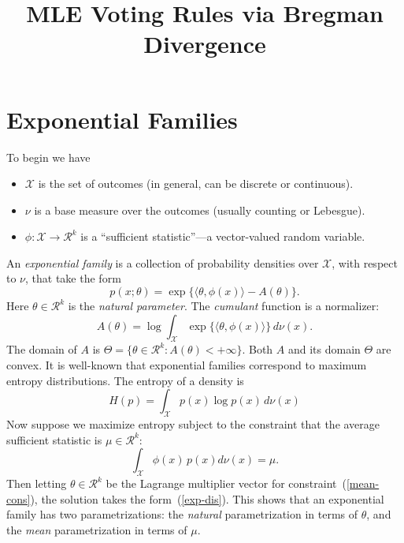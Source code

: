\documentclass[10pt,letterpaper]{article}
\title{MLE Voting Rules via Bregman Divergence}
\newcommand{\X}{\ensuremath{\mathcal{X}}}
\newcommand{\R}{\ensuremath{\mathcal{R}}}
\newcommand{\ip}[2]{\ensuremath{\langle #1, #2 \rangle}}
\begin{document}
\maketitle


\section{Exponential Families}

To begin we have
%
\begin{itemize}
\item $\X$ is the set of outcomes (in general, can be discrete or continuous).
\item $\nu$ is a base measure over the outcomes (usually counting or Lebesgue).
\item $\phi : \X \rightarrow \R^k$ is a ``sufficient statistic''---a vector-valued random variable.
\end{itemize}
%
An \emph{exponential family} is a collection of probability densities over $\X$, with respect to $\nu$, that take the form
%
\begin{equation} \label{exp-dis}
 p(x ; \theta) = \exp \{ \ip{\theta}{\phi(x)} - A(\theta) \}.
\end{equation}
%
Here $\theta \in \R^k$ is the \emph{natural parameter}. The \emph{cumulant} function is a normalizer:
%
\begin{equation} \label{log-partition}
A(\theta) = \log \int_{\X} \exp\{ \ip{\theta}{\phi(x)} \} \, d\nu(x).
\end{equation}
%
The domain of $A$ is $\Theta = \{\theta \in \R^k : A(\theta) < +\infty\}$. Both $A$ and its domain $\Theta$ are convex. It is well-known that exponential families correspond to maximum entropy distributions. The entropy of a density is
%
\begin{equation} \label{entropy}
H(p) = \int_{\X} p(x) \log p(x) \, d\nu(x)
\end{equation}
%
Now suppose we maximize entropy subject to the constraint that the average sufficient statistic is $\mu \in \R^k$:
%
\begin{equation} \label{mean-cons}
\int_{\X} \phi(x) \, p(x) d\nu(x) = \mu.
\end{equation}
%
Then letting $\theta \in \R^k$ be the Lagrange multiplier vector for constraint~(\ref{mean-cons}), the solution takes the form~(\ref{exp-dis}). This shows that an exponential family has two parametrizations: the \emph{natural} parametrization in terms of $\theta$, and the \emph{mean} parametrization in terms of $\mu$.
\end{document}
